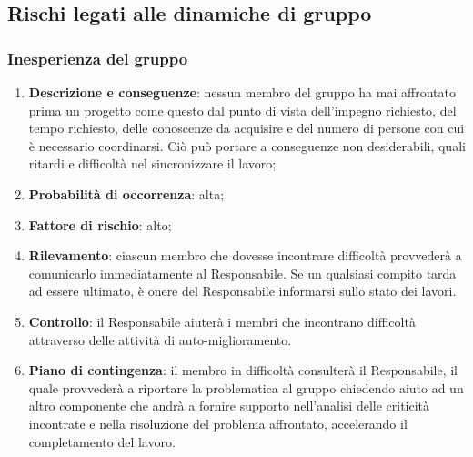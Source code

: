 \subsection{Rischi legati alle dinamiche di gruppo}
	\subsubsection{Inesperienza del gruppo}	
	\begin{enumerate}
		\item \textbf{Descrizione e conseguenze}: nessun membro del gruppo ha mai affrontato prima un progetto come questo dal punto di vista dell'impegno richiesto, del tempo richiesto, delle conoscenze da acquisire e del numero di persone con cui è necessario coordinarsi. Ciò può portare a conseguenze non desiderabili, quali ritardi e difficoltà nel sincronizzare il lavoro;
		\item \textbf{Probabilità di occorrenza}: alta;
		\item \textbf{Fattore di rischio}: alto;
		\item \textbf{Rilevamento}: ciascun membro che dovesse incontrare difficoltà provvederà a comunicarlo immediatamente al Responsabile. Se un qualsiasi compito tarda ad essere ultimato, è onere del Responsabile informarsi sullo stato dei lavori. 
		\item \textbf{Controllo}: il Responsabile aiuterà i membri che incontrano difficoltà attraverso delle attività di auto-miglioramento.
		\item \textbf{Piano di contingenza}: il membro in difficoltà consulterà il Responsabile, il quale provvederà a riportare la problematica al gruppo chiedendo aiuto ad un altro componente che andrà a fornire supporto nell'analisi delle criticità incontrate e nella risoluzione del problema affrontato, accelerando il completamento del lavoro.
	\end{enumerate}
	

